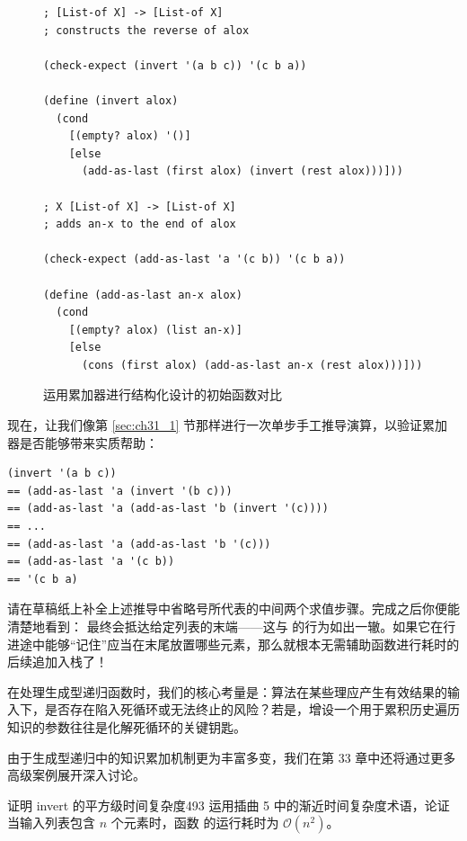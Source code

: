 \begin{figure}[htbp]
  \centering
\begin{lstlisting}[language=BSL, basicstyle=\scriptsize\ttfamily]
; [List-of X] -> [List-of X]
; constructs the reverse of alox

(check-expect (invert '(a b c)) '(c b a))

(define (invert alox)
  (cond
    [(empty? alox) '()]
    [else
      (add-as-last (first alox) (invert (rest alox)))]))

; X [List-of X] -> [List-of X]
; adds an-x to the end of alox

(check-expect (add-as-last 'a '(c b)) '(c b a))

(define (add-as-last an-x alox)
  (cond
    [(empty? alox) (list an-x)]
    [else
      (cons (first alox) (add-as-last an-x (rest alox)))]))
\end{lstlisting}
  \caption{运用累加器进行结构化设计的初始函数对比}
  \label{fig:182}
\end{figure}

现在，让我们像第 \ref{sec:ch31_1} 节那样进行一次单步手工推导演算，以验证累加器是否能够带来实质帮助：

\begin{lstlisting}[language=BSL]
   (invert '(a b c))
== (add-as-last 'a (invert '(b c)))
== (add-as-last 'a (add-as-last 'b (invert '(c))))
== ...
== (add-as-last 'a (add-as-last 'b '(c)))
== (add-as-last 'a '(c b))
== '(c b a)
\end{lstlisting}

\begin{notebox}[请停下来思考！]
请在草稿纸上补全上述推导中省略号所代表的中间两个求值步骤。完成之后你便能清楚地看到： 最终会抵达给定列表的末端——这与  的行为如出一辙。如果它在行进途中能够“记住”应当在末尾放置哪些元素，那么就根本无需辅助函数进行耗时的后续追加入栈了！
\end{notebox}

\begin{notebox}[准则 2：生成型递归中的累加器征兆]
在处理生成型递归函数时，我们的核心考量是：算法在某些理应产生有效结果的输入下，是否存在陷入死循环或无法终止的风险？若是，增设一个用于累积历史遍历知识的参数往往是化解死循环的关键钥匙。
\end{notebox}

由于生成型递归中的知识累加机制更为丰富多变，我们在第 33 章中还将通过更多高级案例展开深入讨论。

\begin{exercise}{证明 invert 的平方级时间复杂度}{493}
运用插曲 5 中的渐近时间复杂度术语，论证当输入列表包含 $n$ 个元素时，函数  的运行耗时为 $\mathcal{O}(n^2)$。
\end{exercise}

